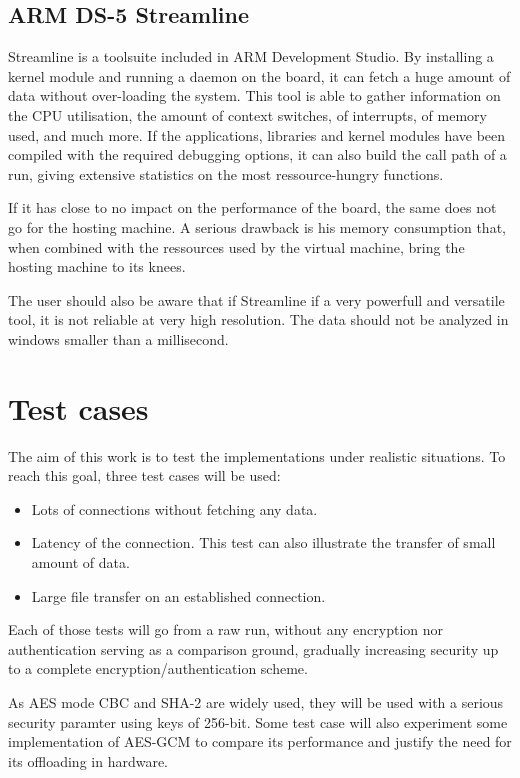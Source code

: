 \subsection{ARM DS-5 Streamline}
Streamline is a toolsuite included in ARM Development Studio.
By installing a kernel module and running a daemon on the board, it can fetch a huge amount of data without over-loading the system.
This tool is able to gather information on the CPU utilisation, the amount of context switches, of interrupts, of memory used, and much more.
If the applications, libraries and kernel modules have been compiled with the required debugging options, it can also build the call path of a run, giving extensive statistics on the most ressource-hungry functions.

If it has close to no impact on the performance of the board, the same does not go for the hosting machine.
A serious drawback is his memory consumption that, when combined with the ressources used by the virtual machine, bring the hosting machine to its knees.

\noindent The user should also be aware that if Streamline if a very powerfull and versatile tool, it is not reliable at very high resolution.
The data should not be analyzed in windows smaller than a millisecond.

\section{Test cases}
The aim of this work is to test the implementations under realistic situations.
To reach this goal, three test cases will be used:
\begin{itemize}
	\item Lots of connections without fetching any data.
	\item Latency of the connection. This test can also illustrate the transfer of small amount of data.
	\item Large file transfer on an established connection.
\end{itemize}

Each of those tests will go from a raw run, without any encryption nor authentication serving as a comparison ground, gradually increasing security up to a complete encryption/authentication scheme.

\noindent As AES mode CBC and SHA-2 are widely used, they will be used with a serious security paramter using keys of 256-bit.
Some test case will also experiment some implementation of AES-GCM to compare its performance and justify the need for its offloading in hardware.

